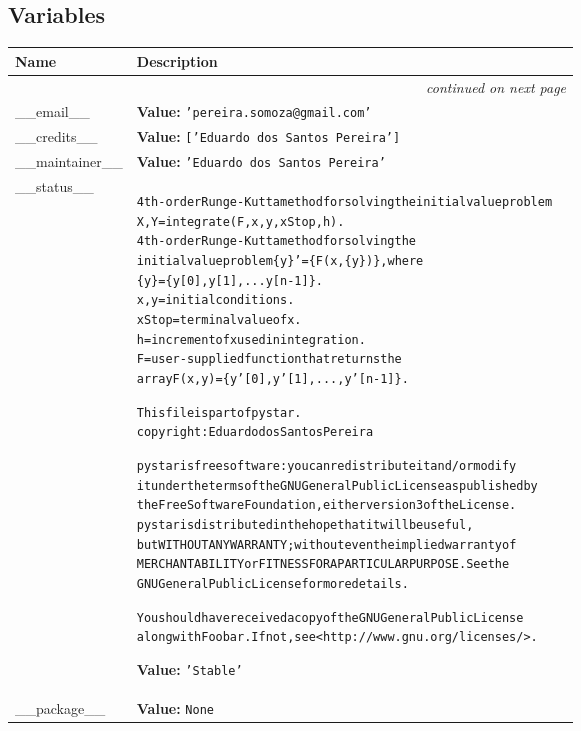   \subsection{Variables}

    \vspace{-1cm}
\hspace{\varindent}\begin{longtable}{|p{\varnamewidth}|p{\vardescrwidth}|l}
\cline{1-2}
\cline{1-2} \centering \textbf{Name} & \centering \textbf{Description}& \\
\cline{1-2}
\endhead\cline{1-2}\multicolumn{3}{r}{\small\textit{continued on next page}}\\\endfoot\cline{1-2}
\endlastfoot\raggedright \_\-\_\-e\-m\-a\-i\-l\-\_\-\_\- & \raggedright \textbf{Value:} 
{\tt \texttt{'}\texttt{pereira.somoza@gmail.com}\texttt{'}}&\\
\cline{1-2}
\raggedright \_\-\_\-c\-r\-e\-d\-i\-t\-s\-\_\-\_\- & \raggedright \textbf{Value:} 
{\tt \texttt{[}\texttt{'}\texttt{Eduardo dos Santos Pereira}\texttt{'}\texttt{]}}&\\
\cline{1-2}
\raggedright \_\-\_\-m\-a\-i\-n\-t\-a\-i\-n\-e\-r\-\_\-\_\- & \raggedright \textbf{Value:} 
{\tt \texttt{'}\texttt{Eduardo dos Santos Pereira}\texttt{'}}&\\
\cline{1-2}
\raggedright \_\-\_\-s\-t\-a\-t\-u\-s\-\_\-\_\- & \raggedright \begin{alltt}
4th-order Runge-Kutta method for solving the initial value problem
X,Y = integrate(F,x,y,xStop,h).
   4th-order Runge-Kutta method for solving the
   initial value problem \{ y\} ’ = \{ F(x,\{ y\} )\} , where
    \{ y\} = \{ y[0],y[1],...y[n-1]\} .
    x,y    = initial conditions.
    xStop = terminal value of x.
    h      = increment of x used in integration.
    F      = user-supplied function that returns the
              array F(x,y) = \{ y’[0],y’[1],...,y’[n-1]\} .


This file is part of pystar.
copyright : Eduardo dos Santos Pereira

pystar is free software: you can redistribute it and/or modify
it under the terms of the GNU General Public License as published by
the Free Software Foundation, either version 3 of the License.
pystar is distributed in the hope that it will be useful,
but WITHOUT ANY WARRANTY; without even the implied warranty of
MERCHANTABILITY or FITNESS FOR A PARTICULAR PURPOSE.  See the
GNU General Public License for more details.

You should have received a copy of the GNU General Public License
along with Foobar.  If not, see {\textless}http://www.gnu.org/licenses/{\textgreater}.
\end{alltt}

\textbf{Value:} 
{\tt \texttt{'}\texttt{Stable}\texttt{'}}&\\
\cline{1-2}
\raggedright \_\-\_\-p\-a\-c\-k\-a\-g\-e\-\_\-\_\- & \raggedright \textbf{Value:} 
{\tt None}&\\
\cline{1-2}
\end{longtable}

